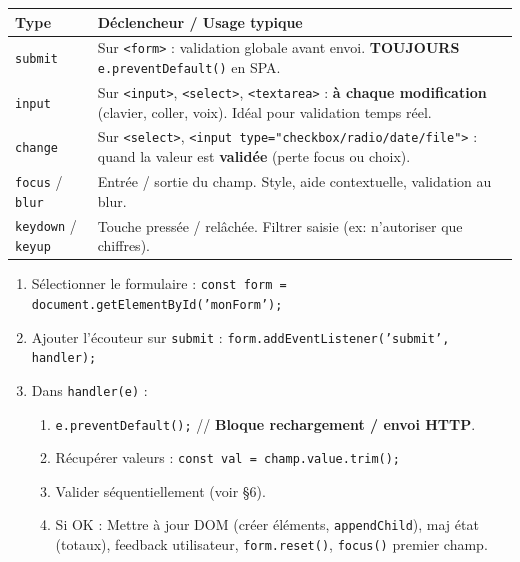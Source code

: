 \documentclass[11pt]{article}
\begin{document}
\begin{propriete}
\begin{center}
\begin{tabularx}{\linewidth}{|l|X|}\hline
\textbf{Type} & \textbf{Déclencheur / Usage typique} \\\hline
\texttt{submit} & Sur \texttt{<form>} : validation globale avant envoi. \textbf{TOUJOURS} \texttt{e.preventDefault()} en SPA. \\\hline
\texttt{input} & Sur \texttt{<input>}, \texttt{<select>}, \texttt{<textarea>} : \textbf{à chaque modification} (clavier, coller, voix). Idéal pour validation temps réel. \\\hline
\texttt{change} & Sur \texttt{<select>}, \texttt{<input type="checkbox/radio/date/file">} : quand la valeur est \textbf{validée} (perte focus ou choix). \\\hline
\texttt{focus} / \texttt{blur} & Entrée / sortie du champ. Style, aide contextuelle, validation au blur. \\\hline
\texttt{keydown} / \texttt{keyup} & Touche pressée / relâchée. Filtrer saisie (ex: n'autoriser que chiffres). \\\hline
\end{tabularx}
\end{center}
\end{propriete}

\begin{methode}
\begin{enumerate}
    \item Sélectionner le formulaire : \texttt{const form = document.getElementById('monForm');}
    \item Ajouter l'écouteur sur \texttt{submit} : \texttt{form.addEventListener('submit', handler);}
    \item Dans \texttt{handler(e)} :
    \begin{enumerate}
        \item \texttt{e.preventDefault();} // \textbf{Bloque rechargement / envoi HTTP}.
        \item Récupérer valeurs : \texttt{const val = champ.value.trim();}
        \item Valider séquentiellement (voir §6).
        \item Si OK : Mettre à jour DOM (créer éléments, \texttt{appendChild}), maj état (totaux), feedback utilisateur, \texttt{form.reset()}, \texttt{focus()} premier champ.
    \end{enumerate}
\end{enumerate}
\end{methode}
\end{document}
